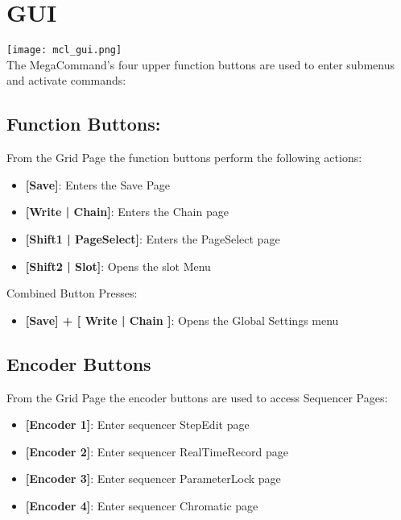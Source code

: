 \chapter{GUI}

\texttt{[image: mcl\_gui.png]}\\
The MegaCommand's four upper function buttons are used to enter submenus and activate commands:
\section{Function Buttons:}
From the Grid Page the function buttons perform the following actions:
\begin{itemize}
\item{\textbf{[Save]}: Enters the Save Page}
\item{\textbf{[Write | Chain]}: Enters the Chain page}
\item{\textbf{[Shift1 | PageSelect]}: Enters the PageSelect page}
\item{\textbf{[Shift2 | Slot]}: Opens the slot Menu }
\end{itemize}
Combined Button Presses:
\begin{itemize}
\item{\textbf{[Save] + [ Write | Chain ]}: Opens the Global Settings menu }
\end{itemize}

\section{Encoder Buttons}
From the Grid Page the encoder buttons are used to access Sequencer Pages:
\begin{itemize}
\item{\textbf{[Encoder 1]}: Enter sequencer StepEdit page}
\item{\textbf{[Encoder 2]}: Enter sequencer RealTimeRecord page}
\item{\textbf{[Encoder 3]}: Enter sequencer ParameterLock page}
\item{\textbf{[Encoder 4]}: Enter sequencer Chromatic page}

\end{itemize}


